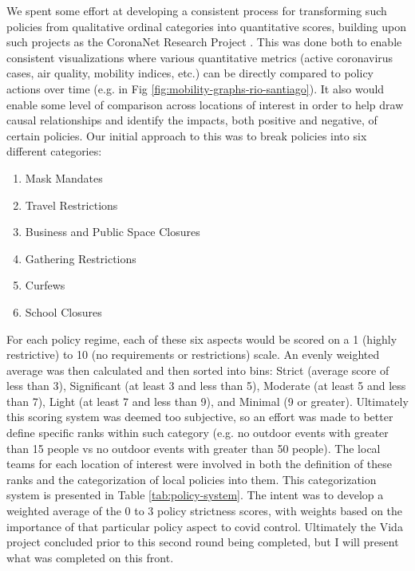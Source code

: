 We spent some effort at developing a consistent process for transforming such policies from qualitative ordinal categories into quantitative scores, building upon such projects as the CoronaNet Research Project \cite{CoronaNetResearchProject}. This was done both to enable consistent visualizations where various quantitative metrics (active coronavirus cases, air quality, mobility indices, etc.) can be directly compared to policy actions over time (e.g. in Fig \ref{fig:mobility-graphs-rio-santiago}). It also would enable some level of comparison across locations of interest in order to help draw causal relationships and identify the impacts, both positive and negative, of certain policies. Our initial approach to this was to break policies into six different categories:

\begin{enumerate}[itemsep=0pt,parsep=0pt]
\item{Mask Mandates}
\item{Travel Restrictions}
\item{Business and Public Space Closures}
\item{Gathering Restrictions}
\item{Curfews}
\item{School Closures}
\end{enumerate}

For each policy regime, each of these six aspects would be scored on a 1 (highly restrictive) to 10 (no requirements or restrictions) scale. An evenly weighted average was then calculated and then sorted into bins: Strict (average score of less than 3), Significant (at least 3 and less than 5), Moderate (at least 5 and less than 7), Light (at least 7 and less than 9), and Minimal (9 or greater). Ultimately this scoring system was deemed too subjective, so an effort was made to better define specific ranks within such category (e.g. no outdoor events with greater than 15 people vs no outdoor events with greater than 50 people). The local teams for each location of interest were involved in both the definition of these ranks and the categorization of local policies into them. This categorization system is presented in Table \ref{tab:policy-system}. The intent was to develop a weighted average of the 0 to 3 policy strictness scores, with weights based on the importance of that particular policy aspect to \ac{covid} control. Ultimately the Vida project concluded prior to this second round being completed, but I will present what was completed on this front.

